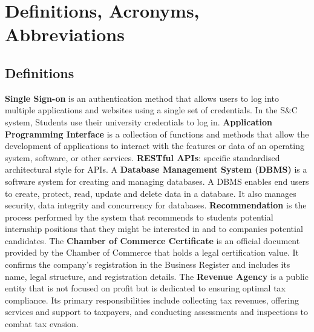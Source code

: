 \section{Definitions, Acronyms, Abbreviations}
\subsection{Definitions}
\textbf{Single Sign-on} is an authentication method that allows users to log into multiple applications and websites using a single set of credentials. In the S\&C system, Students use their university credentials to log in.\newline
\textbf{Application Programming Interface} is a collection of functions and methods that allow the development of applications to interact with the features or data of an operating system, software, or other services.\newline
\textbf{RESTful APIs}: specific standardised architectural style for APIs.\newline
A \textbf{Database Management System (DBMS)} is a software system for creating and managing databases. A DBMS enables end users to create, protect, read, update and delete data in a database. It also manages security, data integrity and concurrency for databases.
\textbf{Recommendation} is the process performed by the system that recommends to students potential internship positions that they might be interested in and to companies potential candidates.\newline
The \textbf{Chamber of Commerce Certificate} is an official document provided by the Chamber of Commerce that holds a legal certification value. It confirms the company's registration in the Business Register and includes its name, legal structure, and registration details.\newline
The \textbf{Revenue Agency} is a public entity that is not focused on profit but is dedicated to ensuring optimal tax compliance. Its primary responsibilities include collecting tax revenues, offering services and support to taxpayers, and conducting assessments and inspections to combat tax evasion.
